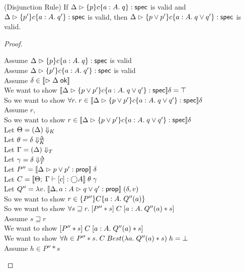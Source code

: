 \begin{lemma}{(Disjunction Rule)}
If $\judgeS{\spec{p}{c}{a:A}{q}}$ is valid and 
   $\judgeS{\spec{p'}{c}{a:A}{q'}}$ is valid, 
then $\judgeS{\spec{p \vee p'}{c}{a:A}{q \vee q'}}$ is valid. 
\end{lemma}

\begin{proof}
  \begin{tabbedproof}
    \oo Assume $\judgeS{\spec{p}{c}{a:A}{q}}$ is valid \\
    \oo Assume $\judgeS{\spec{p'}{c}{a:A}{q'}}$ is valid \\

    \oo Assume $\delta \in \interp{\judgeACtx{\Delta}}$ \\
    \ooo We want to show $\interp{\judgeS{\spec{p \vee p'}{c}{a:A}{q \vee q'}}}\delta = \top$ \\
    \ooo So we want to show $\forall r.\; r \in \interp{\judgeS{\spec{p \vee p'}{c}{a:A}{q \vee q'}}}\delta$ \\
    \ooo Assume $r$, \\
    \oooo So we want to show $r \in\interp{\judgeS{\spec{p \vee p'}{c}{a:A}{q \vee q'}}}\delta$ \\
    \oooo Let $\Theta = \restrictkind{\Delta}$ \\
    \oooo Let $\theta = \restricttyenv{\Delta}{\delta}$ \\
    \oooo Let $\Gamma = \restricttype{\Delta}$ \\
    \oooo Let $\gamma = \restrictvals{\Delta}{\delta}$ \\
    \oooo Let $P'' = \interp{\judgeA{p \vee p'}{\assert}}\;\delta$ \\
    \oooo Let $C = \interp{\judgeE{\Gamma}{[c]}{\monad{A}}}\;\theta\;\gamma$ \\
    \oooo Let $Q'' = \semfun{v}{\interp{\judgeA[\Delta,a:A]{q \vee q'}{\assert}}\;(\delta, v)}$ \\
    \oooo So we want to show $r \in \spec{P''}{C}{a:A}{Q''(a)}$ \\
    \oooo So we want to show $\forall s \sqsupseteq r.\; \basicspec{P'' * s}{C}{a:A}{Q''(a) * s}$ \\
    \oooo Assume $s \sqsupseteq r$ \\
    \ooooo We want to show $\basicspec{P'' * s}{C}{a:A}{Q''(a) * s}$ \\
    \ooooo We want to show $\forall h \in P'' * s.\; C\;Best(\semfun{a}{Q''(a) * s})\;h = \bot$ \\
    \ooooo Assume $h \in P'' * s$ \\

\end{tabbedproof}
\end{proof}
